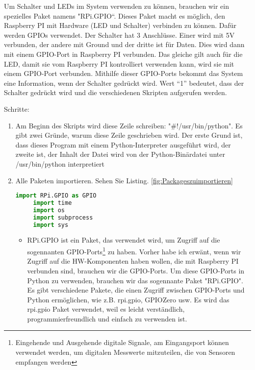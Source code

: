 Um Schalter und LEDs im System verwenden zu k\"onnen, brauchen wir ein spezielles Paket namens "RPi.GPIO“. Dieses Paket macht es m\"oglich, den Raspberry PI mit Hardware (LED und Schalter) verbinden zu k\"onnen. Daf\"ur werden GPIOs verwendet. Der Schalter hat 3 Anschl\"usse. Einer wird mit 5V verbunden, der andere mit Ground und der dritte ist f\"ur Daten. Dies wird dann mit einem GPIO-Port in Raspberry PI verbunden. Das gleiche gilt auch f\"ur die LED, damit sie vom Raspberry PI kontrolliert verwenden kann, wird sie mit einem GPIO-Port verbunden. Mithilfe dieser GPIO-Ports bekommt das System eine Information, wenn der Schalter gedr\"uckt wird. Wert ``1'' bedeutet, dass der Schalter gedr\"uckt wird und die verschiedenen Skripten aufgerufen werden. 

Schritte: 
\begin{enumerate}
	
	\item Am Beginn des Skripts wird diese Zeile schreiben: "\#!/usr/bin/python". Es gibt zwei Gr\"unde, warum diese Zeile geschrieben wird. Der erste Grund ist, dass dieses Program mit einem Python-Interpreter ausgef\"uhrt wird, der zweite ist, der Inhalt der Datei wird von der Python-Binärdatei unter /usr/bin/python interpretiert \\  
	 \item Alle Paketen importieren. Sehen Sie Listing. \ref{fig:Packageszuimportieren} 
	 \begin{lstlisting}[caption={Packages zu importieren},label={fig:Packageszuimportieren},language=Python]
	 import RPi.GPIO as GPIO
	 import time
	 import os
	 import subprocess
	 import sys
	 \end{lstlisting}
	 \begin{itemize}
	 	
	 \item RPi.GPIO ist ein Paket, das verwendet wird, um Zugriff auf die sogennanten GPIO-Ports\footnote{Eingehende und Ausgehende digitale Signale, am Eingangsport k\"onnen verwendet werden, um  digitalen Messwerte mitzuteilen, die von Sensoren empfangen werden} zu haben. Vorher habe ich erw\"ant, wenn wir Zugriff auf die HW-Komponenten haben wollen, die mit Raspberry PI verbunden sind, brauchen wir die GPIO-Ports. Um diese GPIO-Ports in Python zu verwenden, brauchen wir das sogennante Paket "RPi.GPIO". Es gibt verschiedene Pakete, die einen Zugriff zwischen GPIO-Ports und Python erm\"oglichen, wie z.B. rpi.gpio, GPIOZero usw. Es wird das rpi.gpio Paket verwendet, weil es leicht verst\"andlich, programmierfreundlich und einfach zu verwenden ist. \cite{rpigpio}
	 

\end{itemize}
\end{enumerate}
